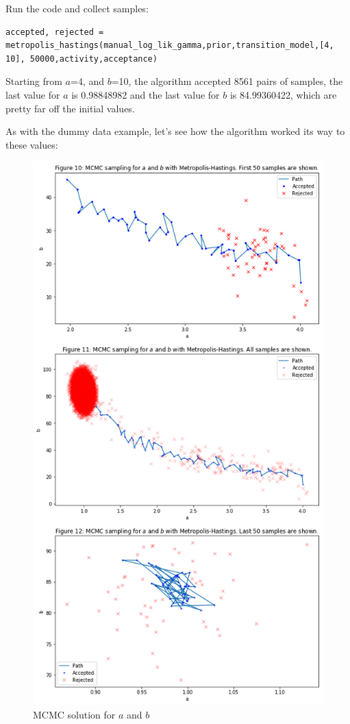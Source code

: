 Run the code and collect samples:
\begin{lstlisting}
accepted, rejected = metropolis_hastings(manual_log_lik_gamma,prior,transition_model,[4, 10], 50000,activity,acceptance)
\end{lstlisting}
Starting from $a$=4, and $b$=10, the algorithm accepted 8561 pairs of samples, the last value for $a$ is 0.98848982 and the last value for $b$ is 84.99360422, which are pretty far off the initial values.

As with the dummy data example, let's see how the algorithm worked its way to these values:

\begin{figure}[h]
    \centering
\includegraphics[width=.8\textwidth]{pic/p05c09-snip11}
    \caption{MCMC solution for $a$ and $b$}
    \label{fig:p05c09-snip11}
\end{figure}

